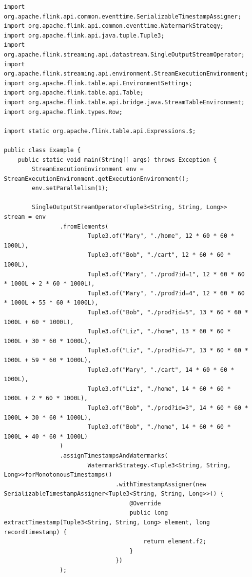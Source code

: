 \documentclass[cn,11pt,chinese]{elegantbook}
\begin{document}
\begin{verbatim}
import org.apache.flink.api.common.eventtime.SerializableTimestampAssigner;
import org.apache.flink.api.common.eventtime.WatermarkStrategy;
import org.apache.flink.api.java.tuple.Tuple3;
import org.apache.flink.streaming.api.datastream.SingleOutputStreamOperator;
import org.apache.flink.streaming.api.environment.StreamExecutionEnvironment;
import org.apache.flink.table.api.EnvironmentSettings;
import org.apache.flink.table.api.Table;
import org.apache.flink.table.api.bridge.java.StreamTableEnvironment;
import org.apache.flink.types.Row;

import static org.apache.flink.table.api.Expressions.$;

public class Example {
    public static void main(String[] args) throws Exception {
        StreamExecutionEnvironment env = StreamExecutionEnvironment.getExecutionEnvironment();
        env.setParallelism(1);

        SingleOutputStreamOperator<Tuple3<String, String, Long>> stream = env
                .fromElements(
                        Tuple3.of("Mary", "./home", 12 * 60 * 60 * 1000L),
                        Tuple3.of("Bob", "./cart", 12 * 60 * 60 * 1000L),
                        Tuple3.of("Mary", "./prod?id=1", 12 * 60 * 60 * 1000L + 2 * 60 * 1000L),
                        Tuple3.of("Mary", "./prod?id=4", 12 * 60 * 60 * 1000L + 55 * 60 * 1000L),
                        Tuple3.of("Bob", "./prod?id=5", 13 * 60 * 60 * 1000L + 60 * 1000L),
                        Tuple3.of("Liz", "./home", 13 * 60 * 60 * 1000L + 30 * 60 * 1000L),
                        Tuple3.of("Liz", "./prod?id=7", 13 * 60 * 60 * 1000L + 59 * 60 * 1000L),
                        Tuple3.of("Mary", "./cart", 14 * 60 * 60 * 1000L),
                        Tuple3.of("Liz", "./home", 14 * 60 * 60 * 1000L + 2 * 60 * 1000L),
                        Tuple3.of("Bob", "./prod?id=3", 14 * 60 * 60 * 1000L + 30 * 60 * 1000L),
                        Tuple3.of("Bob", "./home", 14 * 60 * 60 * 1000L + 40 * 60 * 1000L)
                )
                .assignTimestampsAndWatermarks(
                        WatermarkStrategy.<Tuple3<String, String, Long>>forMonotonousTimestamps()
                                .withTimestampAssigner(new SerializableTimestampAssigner<Tuple3<String, String, Long>>() {
                                    @Override
                                    public long extractTimestamp(Tuple3<String, String, Long> element, long recordTimestamp) {
                                        return element.f2;
                                    }
                                })
                );


\end{verbatim}
\end{document}
